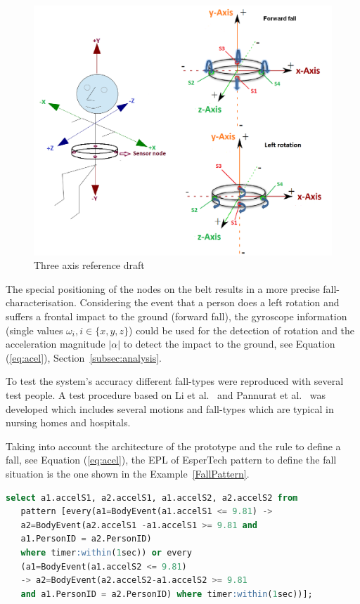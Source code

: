 \documentclass[review]{elsarticle}
\begin{document}
\begin{figure}[!ht]
  \centering
  \includegraphics[scale=0.2]{./img/axis}
  \caption[Three axis reference draft]{Three axis reference draft \cite{LaBlunda.2016b,LuigiMasterThesis}}
  \label{fig:axisreference}
\end{figure}

The special positioning of the nodes on the belt results in a more precise fall-characterisation. Considering 
the event that a person does a left rotation and suffers a frontal impact to the ground (forward fall), 
the gyroscope information (single values $\omega_{i}, i \in \{x,y,z\}$) could be used for the detection of rotation and the 
acceleration magnitude $|\alpha|$ to detect the impact to the ground, see Equation (\ref{eq:acel}), Section~\ref{subsec:analysis}.

To test the system's accuracy different fall-types were reproduced with several test people. A 
test procedure based on Li et al.~\cite{Li2009} and Pannurat et al.~\cite{Pannurat2014} was developed which includes 
several motions and fall-types which are typical in nursing homes and hospitals.

Taking into account the architecture of the prototype and the rule to define a fall, see Equation (\ref{eq:acel}), 
the EPL of EsperTech pattern to define the fall situation is the one shown in the Example~\ref{FallPattern}.

\begin{lstlisting}[basicstyle=\ttfamily\footnotesize,language=SQL,caption=Fall pattern,label=FallPattern]
  select a1.accelS1, a2.accelS1, a1.accelS2, a2.accelS2 from 
   pattern [every(a1=BodyEvent(a1.accelS1 <= 9.81) -> 
   a2=BodyEvent(a2.accelS1 -a1.accelS1 >= 9.81 and 
   a1.PersonID = a2.PersonID) 
   where timer:within(1sec)) or every 
   (a1=BodyEvent(a1.accelS2 <= 9.81)
   -> a2=BodyEvent(a2.accelS2-a1.accelS2 >= 9.81
   and a1.PersonID = a2.PersonID) where timer:within(1sec))];
 \end{lstlisting}
\end{document}
